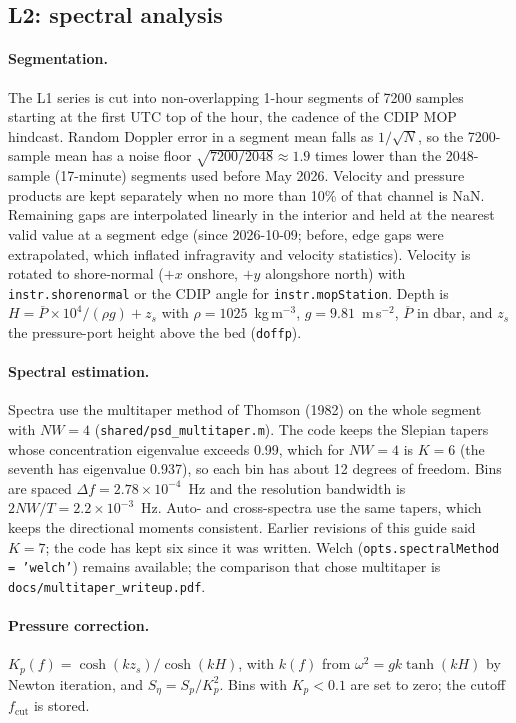 \documentclass[11pt]{article}
\newcommand{\code}[1]{\texttt{#1}}
\begin{document}
\subsection{L2: spectral analysis}

\paragraph{Segmentation.} The L1 series is cut into non-overlapping 1-hour segments of 7200
samples starting at the first UTC top of the hour, the cadence of the CDIP MOP hindcast. Random
Doppler error in a segment mean falls as $1/\sqrt{N}$, so the 7200-sample mean has a noise floor
$\sqrt{7200/2048} \approx 1.9$ times lower than the 2048-sample (17-minute) segments used before
May 2026. Velocity and pressure products are kept separately when no more than 10\% of that
channel is NaN. Remaining gaps are interpolated linearly in the interior and held at the nearest
valid value at a segment edge (since 2026-10-09; before, edge gaps were extrapolated, which
inflated infragravity and velocity statistics). Velocity is rotated to shore-normal ($+x$
onshore, $+y$ alongshore north) with \code{instr.shorenormal} or the CDIP angle for
\code{instr.mopStation}. Depth is $H = \overline{P}\times 10^4/(\rho g) + z_s$ with
$\rho = 1025$~kg\,m$^{-3}$, $g = 9.81$~m\,s$^{-2}$, $\overline{P}$ in dbar, and $z_s$ the
pressure-port height above the bed (\code{doffp}).

\paragraph{Spectral estimation.} Spectra use the multitaper method of Thomson (1982) on the
whole segment with $NW = 4$ (\code{shared/psd\_multitaper.m}). The code keeps the Slepian
tapers whose concentration eigenvalue exceeds 0.99, which for $NW = 4$ is $K = 6$ (the seventh
has eigenvalue 0.937), so each bin has about 12 degrees of freedom. Bins are spaced
$\Delta f = 2.78\times10^{-4}$~Hz and the resolution bandwidth is
$2NW/T = 2.2\times10^{-3}$~Hz. Auto- and cross-spectra use the same tapers, which keeps the
directional moments consistent. Earlier revisions of this guide said $K = 7$; the code has kept
six since it was written. Welch (\code{opts.spectralMethod = 'welch'}) remains available; the
comparison that chose multitaper is \code{docs/multitaper\_writeup.pdf}.

\paragraph{Pressure correction.} $K_p(f) = \cosh(kz_s)/\cosh(kH)$, with $k(f)$ from
$\omega^2 = gk\tanh(kH)$ by Newton iteration, and $S_\eta = S_p / K_p^2$. Bins with
$K_p < 0.1$ are set to zero; the cutoff $f_\text{cut}$ is stored.
\end{document}

